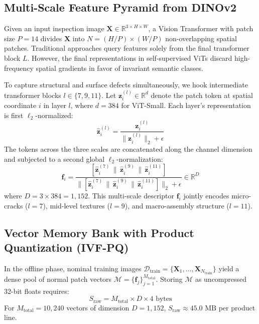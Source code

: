 \documentclass[10pt,journal,compsoc]{IEEEtran}
\begin{document}
\subsection{Multi-Scale Feature Pyramid from DINOv2}
Given an input inspection image $\mathbf{X} \in \mathbb{R}^{3 \times H \times W}$, a Vision Transformer with patch size $P=14$ divides $\mathbf{X}$ into $N = (H/P) \times (W/P)$ non-overlapping spatial patches. Traditional approaches query features solely from the final transformer block $L$. However, the final representations in self-supervised ViTs discard high-frequency spatial gradients in favor of invariant semantic classes.

To capture structural and surface defects simultaneously, we hook intermediate transformer blocks $l \in \{7, 9, 11\}$. Let $\mathbf{z}_i^{(l)} \in \mathbb{R}^d$ denote the patch token at spatial coordinate $i$ in layer $l$, where $d=384$ for ViT-Small. Each layer's representation is first $\ell_2$-normalized:
\begin{equation}
\mathbf{\hat{z}}_i^{(l)} = \frac{\mathbf{z}_i^{(l)}}{\|\mathbf{z}_i^{(l)}\|_2 + \epsilon}
\end{equation}
The tokens across the three scales are concatenated along the channel dimension and subjected to a second global $\ell_2$-normalization:
\begin{equation}
\mathbf{f}_i = \frac{[\mathbf{\hat{z}}_i^{(7)} \,\|\, \mathbf{\hat{z}}_i^{(9)} \,\|\, \mathbf{\hat{z}}_i^{(11)}]}{\|[\mathbf{\hat{z}}_i^{(7)} \,\|\, \mathbf{\hat{z}}_i^{(9)} \,\|\, \mathbf{\hat{z}}_i^{(11)}]\|_2 + \epsilon} \in \mathbb{R}^{D}
\end{equation}
where $D = 3 \times 384 = 1{,}152$. This multi-scale descriptor $\mathbf{f}_i$ jointly encodes micro-cracks ($l=7$), mid-level textures ($l=9$), and macro-assembly structure ($l=11$).

\subsection{Vector Memory Bank with Product Quantization (IVF-PQ)}
In the offline phase, nominal training images $\mathcal{D}_{\text{train}} = \{\mathbf{X}_1, \dots, \mathbf{X}_{N_{\text{train}}}\}$ yield a dense pool of normal patch vectors $\mathcal{M} = \{\mathbf{f}_j\}_{j=1}^{M_{\text{total}}}$. Storing $\mathcal{M}$ as uncompressed 32-bit floats requires:
\begin{equation}
S_{\text{raw}} = M_{\text{total}} \times D \times 4 \text{ bytes}
\end{equation}
For $M_{\text{total}} = 10{,}240$ vectors of dimension $D = 1{,}152$, $S_{\text{raw}} \approx 45.0\text{ MB}$ per product line.
\end{document}
